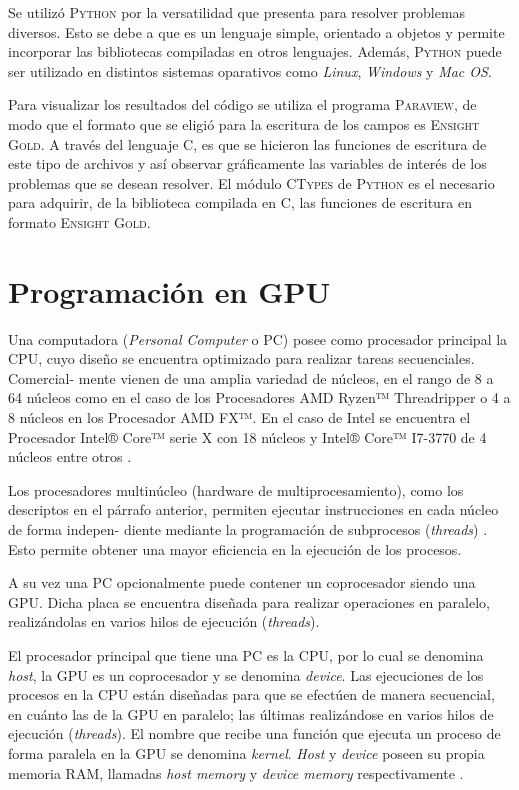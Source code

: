 Se utilizó \textsc{Python} por la versatilidad que presenta para resolver problemas diversos. Esto se debe a que es un lenguaje simple, orientado a objetos y permite incorporar las bibliotecas compiladas en otros lenguajes. Además, \textsc{Python} puede ser utilizado en distintos sistemas oparativos como \textit{Linux}, \textit{Windows} y \textit{Mac OS}. 

Para visualizar los resultados del código se utiliza el programa \textsc{Paraview}, de modo que el formato que se eligió para la escritura de los campos es \textsc{Ensight Gold}. A través del lenguaje \textsc{C}, es que se hicieron las funciones de escritura de este tipo de archivos y así observar gráficamente las variables de interés de los problemas que se desean resolver. El módulo \textsc{CTypes} de \textsc{Python} es el necesario para adquirir, de la biblioteca compilada en \textsc{C}, las funciones de escritura en formato \textsc{Ensight Gold}.



\section{Programación en GPU}
\label{sec_pc}

Una computadora (\textit{Personal Computer} o PC) posee como procesador principal la CPU, cuyo diseño se encuentra optimizado para realizar tareas secuenciales. Comercial- mente vienen de una amplia variedad de núcleos, en el rango de 8 a 64 núcleos como en el caso de los Procesadores AMD Ryzen™ Threadripper o 4 a 8 núcleos en los Procesador AMD FX™. En el caso de Intel se encuentra el Procesador Intel® Core™ serie X con 18 núcleos y  Intel® Core™ I7-3770 de 4 núcleos entre otros \cite{edp:2020:amd} \cite{icp:2020:intel}.

Los procesadores multinúcleo  (hardware de multiprocesamiento), como los descriptos en el párrafo anterior, permiten ejecutar instrucciones en cada núcleo  de forma indepen- diente mediante la programación de subprocesos (\textit{threads}) \cite{rajagopal1999introduction}. Esto permite obtener una mayor eficiencia en la ejecución de los procesos.

A su vez una PC opcionalmente puede contener un coprocesador siendo una GPU. Dicha placa se encuentra diseñada para realizar operaciones en paralelo, realizándolas en varios hilos de ejecución (\textit{threads}).


El procesador principal que tiene una PC es la CPU, por lo cual se denomina \textit{host}, la GPU es un coprocesador y se denomina \textit{device}. Las ejecuciones de los procesos en la CPU están diseñadas para que se efectúen de manera secuencial, en cuánto las de la GPU en paralelo; las últimas realizándose en varios hilos de ejecución (\textit{threads}). El nombre que recibe una función que ejecuta un proceso de forma paralela en la GPU se denomina \textit{kernel}. \textit{Host} y \textit{device} poseen su propia memoria RAM, llamadas \textit{host memory} y \textit{device memory} respectivamente \cite{rinaldi2011modelos}.

